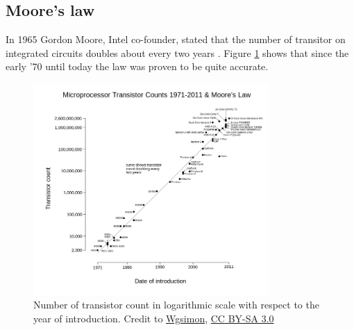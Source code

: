 \subsection{Moore's law}
In 1965 Gordon Moore, Intel co-founder, stated that the number of transitor on integrated circuits doubles about every two years \cite{moore}. Figure \ref{moore} shows that since the early '70 until today the law was proven to be quite accurate.

\begin{figure}
\includegraphics[width=0.8\textwidth]{architectures/moores.png}
\caption{Number of transistor count in logarithmic scale with respect to the year of introduction. Credit to \href{https://commons.wikimedia.org/wiki/User:Wgsimon}{Wgsimon}, \href{http://creativecommons.org/licenses/by-sa/3.0/}{CC BY-SA 3.0}}
\label{moore}
\end{figure}
\clearpage

